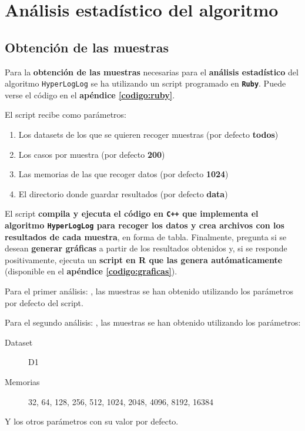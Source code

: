 % 
\section{Análisis estadístico del algoritmo}
\label{analisis}

\subsection{Obtención de las muestras}
Para la \textbf{obtención de las muestras} necesarias para el \textbf{análisis estadístico} del algoritmo \texttt{HyperLogLog}
se ha utilizando un script programado en \textbf{\texttt{Ruby}}. Puede verse el código en el \textbf{apéndice \ref{codigo:ruby}}.

El script recibe como parámetros:
\begin{enumerate}
\item Los datasets de los que se quieren recoger muestras (por defecto \textbf{todos})
\item Los casos por muestra (por defecto \textbf{200})
\item Las memorias de las que recoger datos (por defecto \textbf{1024})
\item El directorio donde guardar resultados (por defecto \textbf{data})
\end{enumerate}

El script \textbf{compila y ejecuta el código en \texttt{C++} que implementa el algoritmo \texttt{HyperLogLog} para recoger los datos
y crea archivos con los resultados de cada muestra}, en forma de tabla. Finalmente, pregunta si se desean
\textbf{generar gráficas} a partir de los resultados obtenidos y, si se responde positivamente, ejecuta un \textbf{script en R que las genera autómaticamente} (disponible en el \textbf{apéndice \ref{codigo:graficas}}).

Para el primer análisis: \textbf{}, las muestras se han obtenido utilizando los parámetros por defecto del script.

Para el segundo análisis: \textbf{}, las muestras se han obtenido utilizando los parámetros:
\begin{description}
\item[Dataset] D1
\item[Memorias] 32, 64, 128, 256, 512, 1024, 2048, 4096, 8192, 16384
\end{description}

Y los otros parámetros con su valor por defecto.

